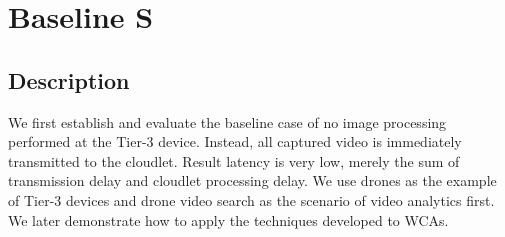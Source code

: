 \section{Baseline S}
\label{sec:dumbdrone}

\subsection{Description}

We first establish and evaluate the baseline case of no image processing
performed at the Tier-3 device.  Instead, all captured video is immediately
transmitted to the cloudlet.  Result latency is very low, merely the sum of
transmission delay and cloudlet processing delay. We use drones as the example
of Tier-3 devices and drone video search as the scenario of video analytics
first. We later demonstrate how to apply the techniques developed to WCAs.

